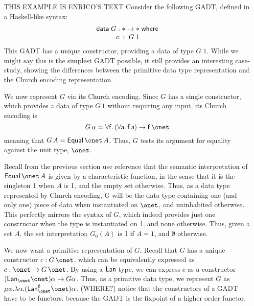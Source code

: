 \documentclass[acmsmall,screen,review,anonymous]{acmart}
\theoremstyle{definition}
\begin{document}
\begin{example}\label{ex:g1}
{\color{red} THIS EXAMPLE IS ENRICO'S TEXT}
Consider the following GADT, defined in a Haskell-like syntax:
\begin{equation}\label{eq:example-GADT}
\begin{array}{l}
\mathsf{data }\; G : \ast \to \ast\;\mathsf{where}\\
\hspace*{0.4in}c\;:\;G\;1
\end{array}
\end{equation}
This GADT has a unique constructor, providing a data of type $G\;1$.
While we might say this is the simplest GADT possible, it still
provides an interesting case-study, showing the differences between
the primitive data type representation and the Church encoding
representation.

We now represent $G$ via its Church encoding.  Since $G$ has a single
constructor, which provides a data of type $G\,1$ without requiring
any input, its Church encoding is
\[
G\,\alpha = \mathsf{\forall f.\, (\forall a.\,
  f\,a) \to f\,\onet}
\]
meaning that $G\,A = \mathsf{Equal}\,\onet\,A$.  Thus, $G$ tests its
argument for equality against the unit type, $\onet$.

Recall from the previous section {\color{blue} use reference} that the
semantic interpretation of $\mathsf{Equal}\,\onet\,A$ is given by a
characteristic function, in the sense that it is the singleton 1 when
$A$ is 1, and the empty set otherwise.  Thus, as a data type
represented by Church encoding, G will be the data type containing one
(and only one) piece of data when instantiated on $\onet$, and
uninhabited otherwise.  This perfectly mirrors the syntax of $G$,
which indeed provides just one constructor when the type is
instantiated on 1, and none otherwise.  Thus, given a set $A$, the set
interpretation $G_0(A)$ is 1 if $A = 1$, and $\emptyset$ otherwise.

We now want a primitive representation of $G$.  Recall that $G$ has a
unique constructor $c : G\,\onet$, which can be equivalently expressed
as $c: \onet \to G\,\onet$.  By using a $\mathsf{Lan}$ type, we can express
$c$ as a constructor $(\Lan_{\onet} \onet)\alpha \to G \alpha$.  Thus,
as a primitive data type, we represent $G$ as $\mu \phi. \lambda
\alpha. (\Lan^{\emptyset}_{\onet} \onet)\alpha$.  {\color{blue}
  (WHERE?) notice that the constructors of a GADT have to be functors,
  because the GADT is the fixpoint of a higher order functor.}


\end{example}
\end{document}
